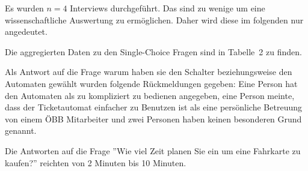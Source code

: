 \documentclass[]{article}
\begin{document}
Es wurden $n=4$ Interviews durchgeführt. Das sind zu wenige um eine wissenschaftliche Auswertung zu ermöglichen. Daher wird diese im folgenden nur angedeutet.

Die aggregierten Daten zu den Single-Choice Fragen sind in Tabelle~2 zu finden.

Als Antwort auf die Frage warum haben sie den Schalter beziehungsweise den Automaten gewählt wurden folgende Rückmeldungen gegeben: Eine Person hat den Automaten als zu kompliziert zu bedienen angegeben, eine Person meinte, dass der Ticketautomat einfacher zu Benutzen ist als eine persönliche Betreuung von einem ÖBB Mitarbeiter und zwei Personen haben keinen besonderen Grund genannt.

Die Antworten auf die Frage ''Wie viel Zeit planen Sie ein um eine Fahrkarte zu kaufen?'' reichten von 2 Minuten bis 10 Minuten.
\end{document}
